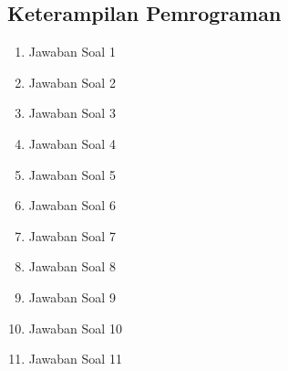 \subsection{Keterampilan Pemrograman}

\begin{enumerate}
\item Jawaban Soal 1


\item Jawaban Soal 2


\item Jawaban Soal 3


\item Jawaban Soal 4


\item Jawaban Soal 5


\item Jawaban Soal 6


\item Jawaban Soal 7


\item Jawaban Soal 8


\item Jawaban Soal 9


\item Jawaban Soal 10


\item Jawaban Soal 11

\end{enumerate}

